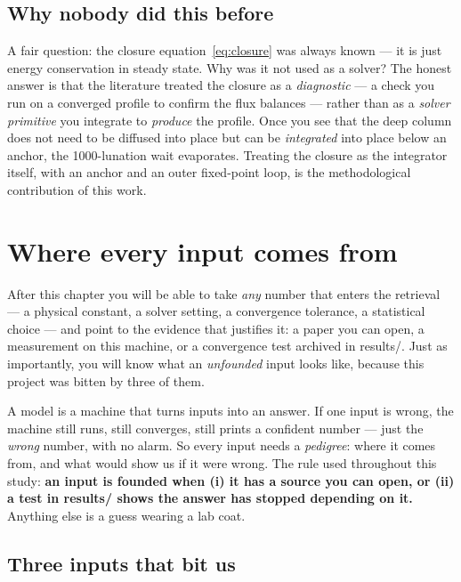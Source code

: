 \documentclass[11pt]{report}
\newcommand{\code}[1]{{\ttfamily\small #1}}
\begin{document}
\section{Why nobody did this before}

A fair question: the closure equation~\eqref{eq:closure} was always known --- it
is just energy conservation in steady state. Why was it not used as a solver? The
honest answer is that the literature treated the closure as a \emph{diagnostic}
--- a check you run on a converged profile to confirm the flux balances --- rather
than as a \emph{solver primitive} you integrate to \emph{produce} the profile.
Once you see that the deep column does not need to be diffused into place but can
be \emph{integrated} into place below an anchor, the 1000-lunation wait
evaporates. Treating the closure as the integrator itself, with an anchor and an
outer fixed-point loop, is the methodological contribution of this work.

\chapter{Where every input comes from}\label{ch:inputs}

After this chapter you will be able to take \emph{any} number that enters the
retrieval --- a physical constant, a solver setting, a convergence tolerance, a
statistical choice --- and point to the evidence that justifies it: a paper you
can open, a measurement on this machine, or a convergence test archived in
\code{results/}. Just as importantly, you will know what an \emph{unfounded}
input looks like, because this project was bitten by three of them.

\begin{plain}
A model is a machine that turns inputs into an answer. If one input is wrong,
the machine still runs, still converges, still prints a confident number ---
just the \emph{wrong} number, with no alarm. So every input needs a
\emph{pedigree}: where it comes from, and what would show us if it were wrong.
The rule used throughout this study: \textbf{an input is founded when (i) it
has a source you can open, or (ii) a test in \code{results/} shows the answer
has stopped depending on it.} Anything else is a guess wearing a lab coat.
\end{plain}

\section{Three inputs that bit us}\label{sec:threebites}
\end{document}
